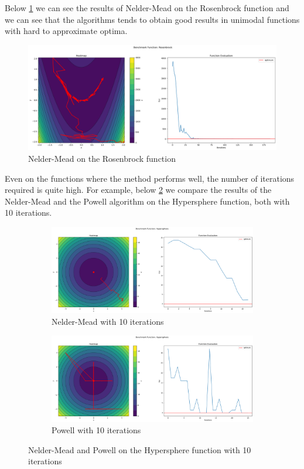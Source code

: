 Below \ref{fig:nm_rosenbrock} we can see the results of Nelder-Mead on the Rosenbrock function and we can see that the algorithms tends to obtain good results in unimodal functions with hard to approximate optima.
\begin{figure}[H]
    \includegraphics[width=\textwidth]{lab1/imgs/nm_rosenbrock.png}
    \caption{Nelder-Mead on the Rosenbrock function}
    \label{fig:nm_rosenbrock}
\end{figure}
Even on the functions where the method performs well, the number of iterations required is quite high. For example, below \ref{fig:hypersphere-100} we compare the results of the Nelder-Mead and the Powell algorithm on the Hypersphere function, both with 10 iterations.
\begin{figure}[H]
    \begin{subfigure}{0.5\textwidth}
        \includegraphics[width=\textwidth]{lab1/imgs/nm_hypersphere_100_iter.png}
        \caption{Nelder-Mead with 10 iterations}
    \end{subfigure}
    \begin{subfigure}{0.5\textwidth}
        \includegraphics[width=\textwidth]{lab1/imgs/pw_hypersphere_10_iter.png}
        \caption{Powell with 10 iterations}
    \end{subfigure}
    \caption{Nelder-Mead and Powell on the Hypersphere function with 10 iterations}
    \label{fig:hypersphere-100}
\end{figure}

